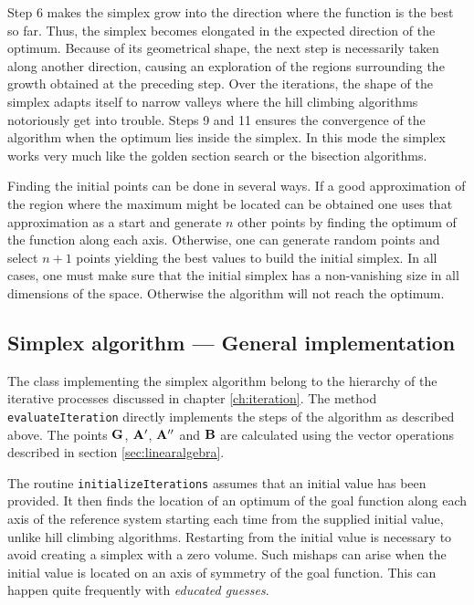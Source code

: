\documentclass[twoside]{book}
\begin{document}
Step 6 makes the simplex grow into the direction where the
function is the best so far. Thus, the simplex becomes elongated
in the expected direction of the optimum. Because of its
geometrical shape, the next step is necessarily taken along
another direction, causing an exploration of the regions
surrounding the growth obtained at the preceding step. Over the
iterations, the shape of the simplex adapts itself to narrow
valleys where the hill climbing algorithms notoriously get into
trouble. Steps 9 and 11 ensures the convergence of the algorithm
when the optimum lies inside the simplex. In this mode the simplex
works very much like the golden section search or the bisection
algorithms.

Finding the initial points can be done in several ways. If a good
approximation of the region where the maximum might be located can
be obtained one uses that approximation as a start and generate
$n$ other points by finding the optimum of the function along each
axis. Otherwise, one can generate random points and select $n+1$
points yielding the best values to build the initial simplex. In
all cases, one must make sure that the initial simplex has a
non-vanishing size in all dimensions of the space. Otherwise the
algorithm will not reach the optimum.

\subsection{Simplex algorithm --- General implementation}
The class implementing the simplex algorithm belong to the
hierarchy of the iterative processes discussed in chapter
\ref{ch:iteration}. The method {\tt evaluateIteration} directly
implements the steps of the algorithm as described above. The
points ${\bf G}$, ${\bf A}^{\prime}$, ${\bf A}^{\prime\prime}$ and
${\bf B}$ are calculated using the vector operations described in
section \ref{sec:linearalgebra}.

The routine {\tt initializeIterations} assumes that an initial
value has been provided. It then finds the location of an optimum
of the goal function along each axis of the reference system
starting each time from the supplied initial value, unlike hill
climbing algorithms. Restarting from the initial value is
necessary to avoid creating a simplex with a zero volume. Such
mishaps can arise when the initial value is located on an axis of
symmetry of the goal function. This can happen quite frequently
with {\sl educated guesses}.
\end{document}
